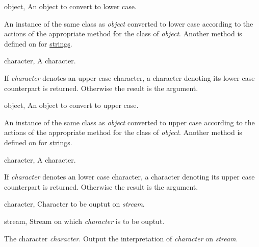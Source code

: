 \begin{optDefinition}
%
%

%
\begin{genericargs}
    \item[object, \classref{object}] An object to convert to lower case.
\end{genericargs}
%
\result%
An instance of the same class as {\em object\/} converted to lower case
according to the actions of the appropriate method for the class of {\em
    object}.
%
\seealso%
Another method is defined on  for
\hyperref[string]{strings}.

%
\begin{specargs}
    \item[character, \classref{character}] A character.
\end{specargs}
%
\result%
If {\em character\/} denotes an upper case character, a character denoting its
lower case counterpart is returned.  Otherwise the result is the argument.

%
\begin{genericargs}
    \item[object, \classref{object}] An object to convert to upper case.
\end{genericargs}
%
\result%
An instance of the same class as {\em object\/} converted to upper case
according to the actions of the appropriate method for the class of {\em
    object}.
%
\seealso%
Another method is defined on  for
\hyperref[string]{strings}.

%
\begin{specargs}
    \item[character, \classref{character}] A character.
\end{specargs}
%
\result%
If {\em character\/} denotes an lower case character, a character denoting its
upper case counterpart is returned.  Otherwise the result is the argument.

%
\begin{specargs}
    \item[character, \classref{character}] Character to be ouptut on {\em
        stream}.
    \item[stream, \classref{stream}] Stream on which {\em character\/} is to be
    ouptut.
\end{specargs}
%
\result%
The character {\em character}.
%
\remarks%
Output the interpretation of {\em character\/} on {\em stream}.


\end{optDefinition}
